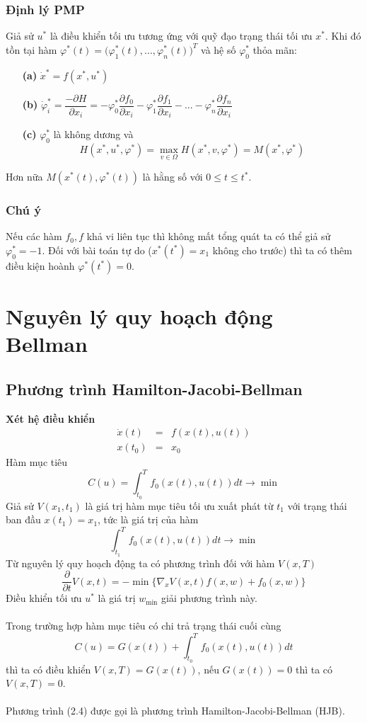 \documentclass[12pt,a4paper]{report}
\begin{document}
	\subsubsection{Định lý PMP} Giả sử $u^*$ là điều khiển tối ưu tương ứng với quỹ đạo trạng thái tối ưu $x^*$. Khi đó tồn tại hàm $\varphi^*(t) = \big(\varphi_1^*(t),..., \varphi_n^*(t)\big)^T$ và hệ số $\varphi_0^*$ thỏa mãn:
	\begin{itemize}
		\item[\textbf{(a)}] $\dot{x}^* = f(x^*, u^*)$
		\item[\textbf{(b)}] $\dot{\varphi}_i^* = \dfrac{-\partial H}{\partial x_i} = -\varphi_0^*\dfrac{\partial f_0}{\partial x_i} - \varphi_1^*\dfrac{\partial f_1}{\partial x_i} - ... - \varphi_n^*\dfrac{\partial f_n}{\partial x_i}$
		\item[\textbf{(c)}]$\varphi_0^*$ là không dương và $$H(x^*, u^*, \varphi^*) = \max_{v\in \Omega}H(x^*, v, \varphi^*) = M(x^*, \varphi^*)$$
	\end{itemize} Hơn nữa $M(x^*(t), \varphi^*(t))$ là hằng số với $0 \leq t \leq t^*$. \subsubsection{Chú ý} Nếu các hàm $f_0, f$ khả vi liên tục thì không mất tổng quát ta có thể giả sử $\varphi_0^* = -1$. Đối với bài toán tự do ($x^*(t^*) = x_1$ không cho trước) thì ta có thêm điều kiện hoành $\varphi^*(t^*) = 0$.

\section{Nguyên lý quy hoạch động Bellman}
\subsection{Phương trình Hamilton-Jacobi-Bellman}
\textbf{Xét hệ điều khiển} 
\begin{eqnarray}
	\dot{x}(t) &=& f(x(t), u(t)) \nonumber \\ x(t_0) &=& x_0 \nonumber
\end{eqnarray} Hàm mục tiêu $$C(u) = \int_{t_0}^{T}f_0(x(t), u(t))dt \to \min$$
Giả sử $V(x_1, t_1)$ là giá trị hàm mục tiêu tối ưu xuất phát từ $t_1$ với trạng thái ban đầu $x(t_1) = x_1$, tức là giá trị của hàm $$\int_{t_1}^{T}f_0(x(t), u(t))dt \to \min$$ Từ nguyên lý quy hoạch động ta có phương trình đối với hàm $V(x, T)$ \begin{equation}
	\dfrac{\partial}{\partial t}V(x, t) = - \min\big\{\nabla_xV(x,t)f(x, w) + f_0(x, w)\big\}
\end{equation} 
Điều khiển tối ưu $u^*$ là giá trị $w_{\min}$ giải phương trình này. \\\\ Trong trường hợp hàm mục tiêu có chi trả trạng thái cuối cùng $$C(u) = G(x(t)) + \int_{t_0}^{T}f_0(x(t), u(t))dt$$ thì ta có điều khiển $V(x, T) = G(x(t))$, nếu $G(x(t)) = 0$ thì ta có $V(x, T) = 0$.\\\\ Phương trình (2.4) được gọi là phương trình Hamilton-Jacobi-Bellman (HJB).
\end{document}
